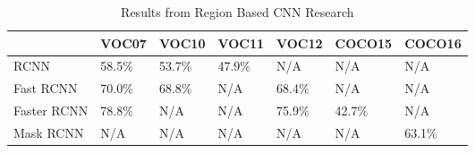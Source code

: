 \begin{table}[h]
    \centering
    \caption{Results from Region Based CNN Research}
    \label{rcnnResults}
    \begin{tabular}{|l|l|l|l|l|l|l|}
    \hline
                    & \textbf{VOC07} & \textbf{VOC10} & \textbf{VOC11} & \textbf{VOC12} & \textbf{COCO15} &
                    \textbf{COCO16} \\ \hline
                    RCNN        & 58.5\%  & 53.7\%  & 47.9\%  & N/A     & N/A
                    & N/A      \\ \hline
                    Fast RCNN   & 70.0\%  & 68.8\%  & N/A     & 68.4\%  & N/A
                    & N/A      \\ \hline
                    Faster RCNN & 78.8\%  & N/A     & N/A     & 75.9\%  & 42.7\%
                    & N/A      \\ \hline
                    Mask RCNN   & N/A     & N/A     & N/A     & N/A     & N/A
                    & 63.1\%  \\ \hline
    \end{tabular}
\end{table}

